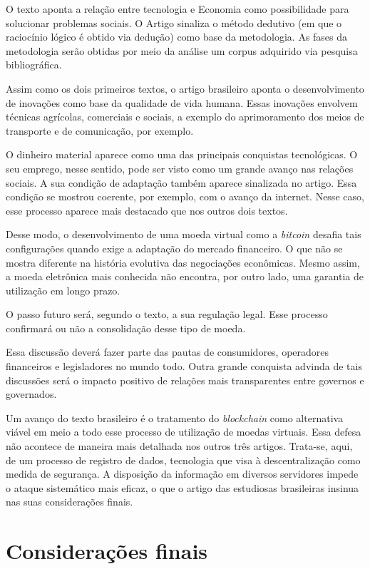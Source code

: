 \documentclass[12pt]{article}
\begin{document}
O texto aponta a relação entre tecnologia e Economia como possibilidade para solucionar problemas sociais. O Artigo sinaliza o método dedutivo (em que o raciocínio lógico é obtido via dedução) como base da metodologia. As fases da metodologia serão obtidas por meio da análise um corpus adquirido via pesquisa bibliográfica.

Assim como os dois primeiros textos, o artigo brasileiro aponta o desenvolvimento de inovações como base da qualidade de vida humana. Essas inovações envolvem técnicas agrícolas, comerciais e sociais, a exemplo do aprimoramento dos meios de transporte e de comunicação, por exemplo.

O dinheiro material aparece como uma das principais conquistas tecnológicas. O seu emprego, nesse sentido, pode ser visto como um grande avanço nas relações sociais. A sua condição de adaptação também aparece sinalizada no artigo. Essa condição se mostrou coerente, por exemplo, com o avanço da internet. Nesse caso, esse processo aparece mais destacado que nos outros dois textos.

Desse modo, o desenvolvimento de uma moeda virtual como a \textit{bitcoin} desafia tais configurações quando exige a adaptação do mercado financeiro. O que não se mostra diferente na história evolutiva das negociações econômicas. Mesmo assim, a moeda eletrônica mais conhecida não encontra, por outro lado, uma garantia de utilização em longo prazo. 

O passo futuro será, segundo o texto, a sua regulação legal. Esse processo confirmará ou não a consolidação desse tipo de moeda.

Essa discussão deverá fazer parte das pautas de consumidores, operadores financeiros e legisladores no mundo todo. Outra grande conquista advinda de tais discussões será o impacto positivo de relações mais transparentes entre governos e governados.

Um avanço do texto brasileiro é o tratamento do \textit{blockchain} como alternativa viável em meio a todo esse processo de utilização de moedas virtuais. Essa defesa não acontece de maneira mais detalhada nos outros três artigos. Trata-se, aqui, de um processo de registro de dados, tecnologia que visa à descentralização como medida de segurança. A disposição da informação em diversos servidores impede o ataque sistemático mais eficaz, o que o artigo das estudiosas brasileiras insinua nas suas considerações finais.


\section{Considerações finais}
\end{document}
